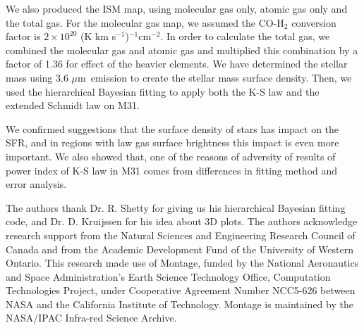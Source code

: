 \documentclass[useAMS,usenatbib]{mn2e}
\newcommand \um    {$\mu$m\ }
\begin{document}
We also produced the ISM map, using molecular gas only, atomic gas only and the total gas. %
For the molecular gas map, we assumed the CO-H$_2$ conversion factor is $2 \times 10^{20}$ (K km s$^{-1}$)$^{-1}$cm$^{-2}$. 
In order to calculate the total gas, we combined the molecular gas and atomic gas and multiplied this combination by a factor of 1.36 for effect of the heavier elements. We have determined the stellar mass using 3.6 \um emission to create the stellar mass surface density. Then, we used the hierarchical Bayesian fitting to apply both the K-S law and the extended Schmidt law on M31.

We confirmed \cite{Shi11} suggestions that the surface density of stars has impact on the SFR, and in regions with law gas surface brightness this impact is even more important. We also showed that, one of the reasons of adversity of results of power index of K-S law in M31 comes from differences in fitting method and error analysis. %


The authors thank Dr. R. Shetty for giving us his hierarchical Bayesian fitting code, and Dr. D. Kruijssen for his idea about 3D plots.
The authors acknowledge research support from the Natural Sciences and Engineering Research Council of Canada and from the Academic Development Fund of the University of Western Ontario. 
This research made use of Montage, funded by the National Aeronautics and Space Administration's Earth Science Technology Office, Computation Technologies Project, under Cooperative Agreement Number NCC5-626 between NASA and the California Institute of Technology. Montage is maintained by the NASA/IPAC Infra-red Science Archive.

\end{document}
